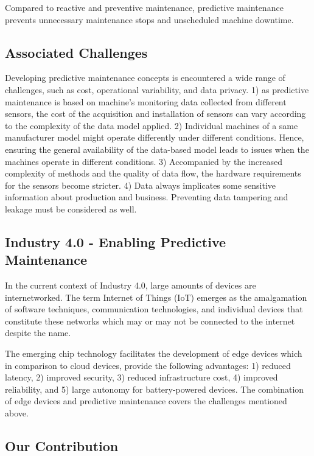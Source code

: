 \documentclass[conference]{IEEEtran}
\begin{document}
Compared to reactive and preventive maintenance, predictive maintenance prevents unnecessary maintenance stops and unscheduled machine downtime.

\subsection{Associated Challenges}
\label{sec_associated_challenges}

Developing predictive maintenance concepts is encountered a wide range of challenges, such as cost, operational variability, and data privacy. 1) as predictive maintenance is based on machine's monitoring data collected from different sensors, the cost of the acquisition and installation of sensors can vary according to the complexity of the data model applied. 2) Individual machines of a same manufacturer model might operate differently under different conditions. Hence, ensuring the general availability of the data-based model leads to issues when the machines operate in different conditions. 3) Accompanied by the increased complexity of methods and the quality of data flow, the hardware requirements for the sensors become stricter. 4) Data always implicates some sensitive information about production and business. Preventing data tampering and leakage must be considered as well.

\subsection{Industry 4.0 - Enabling Predictive Maintenance}

In the current context of Industry 4.0, large amounts of devices are internetworked. The term Internet of Things (IoT) emerges as the amalgamation of software techniques, communication technologies, and individual devices that constitute these networks which may or may not be connected to the internet despite the name.

The emerging chip technology facilitates the development of edge devices which in comparison to cloud devices, provide the following advantages: 1) reduced latency, 2) improved security, 3) reduced infrastructure cost, 4) improved reliability, and 5) large autonomy for battery-powered devices. The combination of edge devices and predictive maintenance covers the challenges mentioned above.

\subsection{Our Contribution}
\end{document}

